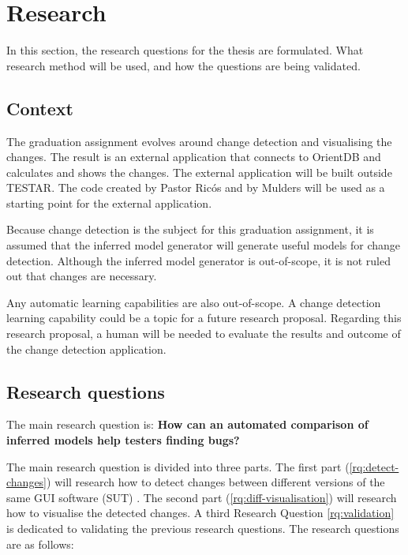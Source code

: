 \chapter{Research} \label{questions}
In this section, the research questions for the thesis are formulated. What research method will be used, and how the questions are being validated.

\section{Context}
The graduation assignment evolves around change detection and visualising the changes. The result is an external application that connects to OrientDB and calculates and shows the changes. The external application will be built outside TESTAR. The code created by Pastor Ricós and by Mulders will be used as a starting point for the external application. 

Because change detection is the subject for this graduation assignment, it is assumed that the inferred model generator will generate useful models for change detection. Although the inferred model generator is out-of-scope, it is not ruled out that changes are necessary.

Any automatic learning capabilities are also out-of-scope. A change detection learning capability could be a topic for a future research proposal. Regarding this research proposal, a human will be needed to evaluate the results and outcome of the change detection application.

\section{Research questions} \label{research-questions}
        
The main research question is: \textbf{How can an automated comparison of inferred models help testers finding bugs?}

The main research question is divided into three parts. The first part (\ref{rq:detect-changes}) will research how to detect changes between different versions of the same GUI software (SUT) \cite{testar-todo}. The second part (\ref{rq:diff-visualisation}) will research how to visualise the detected changes. A third Research Question \ref{rq:validation} is dedicated to validating the previous research questions. The research questions are as follows: 

